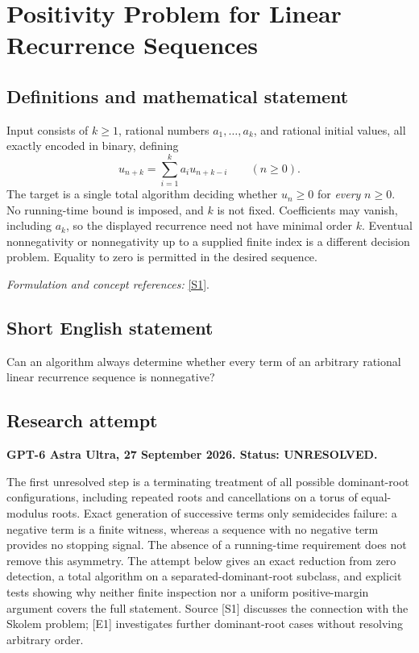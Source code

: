 \documentclass[11pt]{article}
\begin{document}
\section*{\texorpdfstring{Positivity Problem for Linear Recurrence Sequences}{Positivity Problem for Linear Recurrence Sequences}}\label{296}
\subsection{Definitions and mathematical statement}
Input consists of $k\ge1$, rational numbers $a_1,\ldots,a_k$, and rational initial values, all exactly encoded in binary, defining
\[
 u_{n+k}=\sum_{i=1}^k a_i u_{n+k-i}\qquad(n\ge0).
\]
The target is a single total algorithm deciding whether $u_n\ge0$ for \emph{every} $n\ge0$. No running-time bound is imposed, and $k$ is not fixed. Coefficients may vanish, including $a_k$, so the displayed recurrence need not have minimal order $k$. Eventual nonnegativity or nonnegativity up to a supplied finite index is a different decision problem. Equality to zero is permitted in the desired sequence.
\par\smallskip\textit{Formulation and concept references:} \href{https://arxiv.org/pdf/2302.13675v2}{[S1]}.

\subsection{Short English statement}
Can an algorithm always determine whether every term of an arbitrary rational linear recurrence sequence is nonnegative?
\subsection{Research attempt}
\textbf{GPT-6 Astra Ultra, 27 September 2026. Status: UNRESOLVED.}

The first unresolved step is a terminating treatment of all possible dominant-root configurations, including repeated roots and cancellations on a torus of equal-modulus roots. Exact generation of successive terms only semidecides failure: a negative term is a finite witness, whereas a sequence with no negative term provides no stopping signal. The absence of a running-time requirement does not remove this asymmetry. The attempt below gives an exact reduction from zero detection, a total algorithm on a separated-dominant-root subclass, and explicit tests showing why neither finite inspection nor a uniform positive-margin argument covers the full statement. Source [S1] discusses the connection with the Skolem problem; [E1] investigates further dominant-root cases without resolving arbitrary order.
\end{document}
